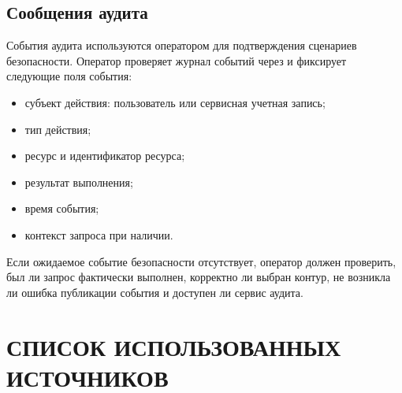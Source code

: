 \documentclass[12pt,a4paper]{extarticle}
\begin{document}
\subsection{Сообщения аудита}

\begin{hseExample}
События аудита используются оператором для подтверждения сценариев безопасности. Оператор проверяет журнал событий через  и фиксирует следующие поля события:

\begin{itemize}[leftmargin=1.25cm]
    \item субъект действия: пользователь или сервисная учетная запись;
    \item тип действия;
    \item ресурс и идентификатор ресурса;
    \item результат выполнения;
    \item время события;
    \item контекст запроса при наличии.
\end{itemize}

Если ожидаемое событие безопасности отсутствует, оператор должен проверить, был ли запрос фактически выполнен, корректно ли выбран контур, не возникла ли ошибка публикации события и доступен ли сервис аудита.
\end{hseExample}

\clearpage

\pagestyle{appendix}

\section*{СПИСОК ИСПОЛЬЗОВАННЫХ ИСТОЧНИКОВ}
\end{document}
